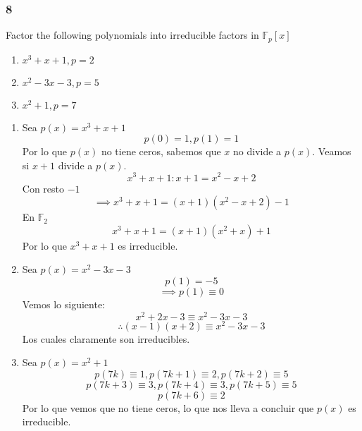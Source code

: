 \documentclass[11pt]{article}
\newcommand{\set}[1]{\mathbb{#1}}
\theoremstyle{definition}
\begin{document}
        \subsubsection{8}
        Factor the following polynomials into irreducible factors in $\set{F}_p[x]$
        \begin{enumerate}[label=\textbf{(\alph*)}]
            \item $x^3+x+1,p=2$

            \item $x^2-3x-3,p=5$

            \item $x^2+1,p=7$
        \end{enumerate} 
        \begin{enumerate}[label=\textbf{(\alph*)}]
            \item Sea $p(x)=x^3+x+1$
            \[p(0)=1,p(1)=1\]
            Por lo que $p(x)$ no tiene ceros, sabemos que $x$ no divide a $p(x)$. Veamos si $x+1$ divide a $p(x)$.
            \[x^3+x+1:x+1=x^2-x+2\]
            Con resto $-1$
            \[\implies x^3+x+1=(x+1)(x^2-x+2)-1\]
            En $\set{F}_2$
            \[x^3+x+1=(x+1)(x^2+x)+1\]
            Por lo que $x^3+x+1$ es irreducible.

            \item Sea $p(x)=x^2-3x-3$
            \[p(1)=-5\]
            \[\implies p(1)\equiv 0\]
            Vemos lo siguiente:
            \[x^2+2x-3\equiv x^2-3x-3\]
            \[\therefore (x-1)(x+2)\equiv x^2-3x-3\]
            Los cuales claramente son irreducibles.

            \item Sea $p(x)=x^2+1$
            \[p(7k)\equiv 1,p(7k+1)\equiv 2,p(7k+2)\equiv 5\]
            \[p(7k+3)\equiv 3,p(7k+4)\equiv 3,p(7k+5)\equiv 5\]
            \[p(7k+6)\equiv 2\]
            Por lo que vemos que no tiene ceros, lo que nos lleva a concluir que $p(x)$ es irreducible.
        \end{enumerate}
    
\end{document}
